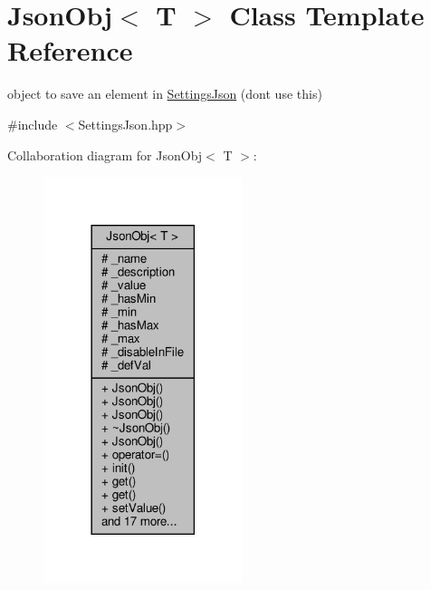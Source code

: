 \hypertarget{class_json_obj}{}\section{Json\+Obj$<$ T $>$ Class Template Reference}
\label{class_json_obj}


object to save an element in \hyperlink{class_settings_json}{Settings\+Json} (dont use this)  




{\ttfamily \#include $<$Settings\+Json.\+hpp$>$}



Collaboration diagram for Json\+Obj$<$ T $>$\+:
\nopagebreak
\begin{figure}[H]
\begin{center}
\leavevmode
\includegraphics[width=165pt]{class_json_obj__coll__graph}
\end{center}
\end{figure}
